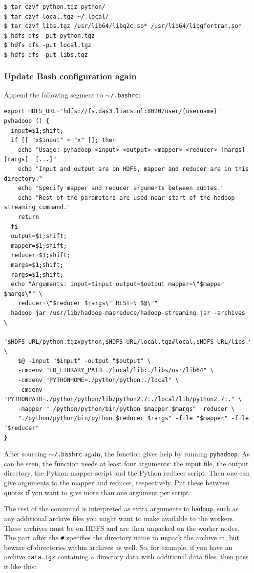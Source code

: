 \documentclass{article}
\begin{document}
\begin{verbatim}
$ tar czvf python.tgz python/
$ tar czvf local.tgz ~/.local/
$ tar czvf libs.tgz /usr/lib64/libg2c.so* /usr/lib64/libgfortran.so*
$ hdfs dfs -put python.tgz
$ hdfs dfs -put local.tgz
$ hdfs dfs -put libs.tgz
\end{verbatim}

\subsubsection{Update Bash configuration again}\label{app:update-bashrc-again}

Append the following segment to \texttt{$\sim$/.bashrc}:

\begin{verbatim}
export HDFS_URL='hdfs://fs.das3.liacs.nl:8020/user/{username}'
pyhadoop () {
  input=$1;shift;
  if [[ "x$input" = "x" ]]; then
    echo "Usage: pyhadoop <input> <output> <mapper> <reducer> [margs] [rargs]  [...]"
    echo "Input and output are on HDFS, mapper and reducer are in this directory."
    echo "Specify mapper and reducer arguments between quotes."
    echo "Rest of the parameters are used near start of the hadoop streaming command."
    return
  fi
  output=$1;shift;
  mapper=$1;shift;
  reducer=$1;shift;
  margs=$1;shift;
  rargs=$1;shift;
  echo "Arguments: input=$input output=$output mapper=\"$mapper $margs\"" \
    reducer=\"$reducer $rargs\" REST=\"$@\""
  hadoop jar /usr/lib/hadoop-mapreduce/hadoop-streaming.jar -archives \
    "$HDFS_URL/python.tgz#python,$HDFS_URL/local.tgz#local,$HDFS_URL/libs.tgz#libs" \
    $@ -input "$input" -output "$output" \
    -cmdenv "LD_LIBRARY_PATH=./local/lib:./libs/usr/lib64" \
    -cmdenv "PYTHONHOME=./python/python:./local" \
    -cmdenv "PYTHONPATH=./python/python/lib/python2.7:./local/lib/python2.7:." \
    -mapper "./python/python/bin/python $mapper $margs" -reducer \
    "./python/python/bin/python $reducer $rargs" -file "$mapper" -file "$reducer"
}
\end{verbatim}

After sourcing \texttt{$\sim$/.bashrc} again, the function gives help by 
running \texttt{pyhadoop}. As can be seen, the function needs at least four 
arguments: the input file, the output directory, the Python mapper script and 
the Python reducer script. Then one can give arguments to the mapper and 
reducer, respectively. Put these between quotes if you want to give more than 
one argument per script.

The rest of the command is interpreted as extra arguments to \texttt{hadoop}, 
such as any additional archive files you might want to make available to the 
workers. These archives must be on HDFS and are then unpacked on the worker 
nodes. The part after the \texttt{\#} specifies the directory name to unpack 
the archive in, but beware of directories within archives as well. So, for 
example, if you have an archive \texttt{data.tgz} containing a directory data 
with additional data files, then pass it like this:
\end{document}
